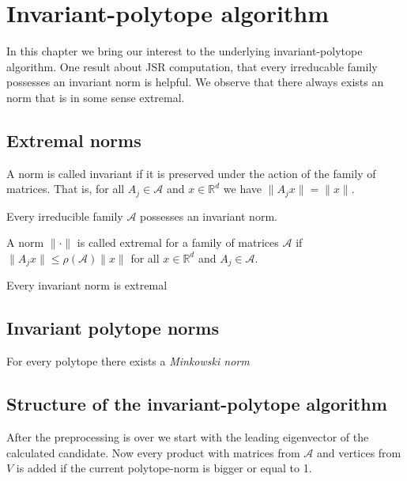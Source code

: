 
\chapter{Invariant-polytope algorithm}
\label{ch:inv.poly}	

In this chapter we bring our interest to the underlying invariant-polytope algorithm. 
One result about JSR computation, that every irreducable family possesses an invariant norm is helpful. We observe that there always exists an norm that is in some sense extremal. 

\section{Extremal norms}
\label{sec:extremal-norms}

A norm is called invariant if it is preserved under the action of the family of matrices. That is, for all $A_j \in \mathcal{A}$ and $x \in \mathbb{R}^d$ we have $\lVert A_j x \rVert = \lVert x \rVert$.

\begin{theorem}
    Every irreducible family $\mathcal{A}$ possesses an invariant norm.
\end{theorem}

\begin{definition}
    A norm $\lVert \cdot \rVert$ is called extremal for a family of matrices $\mathcal{A}$ if $\lVert A_j x \rVert \leq \rho(\mathcal{A}) \lVert x \rVert$ for all $x \in \mathbb{R}^d$ and $A_j \in \mathcal{A}$.
\end{definition}

Every invariant norm is extremal

\section{Invariant polytope norms}
For every polytope there exists a \emph{Minkowski norm}

\section{Structure of the invariant-polytope algorithm}
After the preprocessing is over we start with the leading eigenvector of the calculated candidate. 
Now every product with matrices from $\mathcal{A}$ and vertices from $V$ is added if the current polytope-norm is bigger or equal to 1.

\vspace{1cm}

